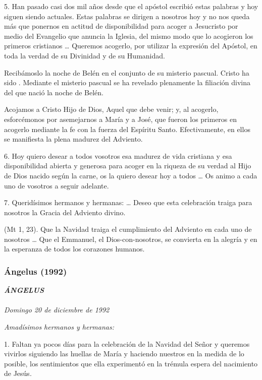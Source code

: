 5. Han pasado casi dos mil años desde que el apóstol escribió estas palabras y hoy siguen siendo actuales. Estas palabras se dirigen a nosotros hoy y no nos queda más que ponernos en actitud de disponibilidad para acoger a Jesucristo por medio del Evangelio que anuncia la Iglesia, del mismo modo que lo acogieron los primeros cristianos \ldots{} Queremos acogerlo, por utilizar la expresión del Apóstol, en toda la verdad de su Divinidad y de su Humanidad.

Recibámoslo la noche de Belén en el conjunto de su misterio pascual.  Cristo ha sido . Mediante el misterio pascual se ha revelado plenamente la filiación divina del que nació la noche de Belén.

Acojamos a Cristo Hijo de Dios, Aquel que debe venir; y, al acogerlo, esforcémonos por asemejarnos a María y a José, que fueron los primeros en acogerlo mediante la fe con la fuerza del Espíritu Santo. Efectivamente, en ellos se manifiesta la plena madurez del Adviento.

6. Hoy quiero desear a todos vosotros esa madurez de vida cristiana y esa disponibilidad abierta y generosa para acoger en la riqueza de su verdad al Hijo de Dios nacido según la carne, os la quiero desear hoy a todos \ldots{} Os animo a cada uno de vosotros a seguir adelante.

7. Queridísimos hermanos y hermanas:  \ldots{} Deseo que esta celebración traiga para nosotros la Gracia del Adviento divino.

 (Mt 1, 23). Que la Navidad traiga el cumplimiento del Adviento en cada uno de nosotros \ldots{} Que el Emmanuel, el Dios-con-nosotros, se convierta en la alegría y en la esperanza de todos los corazones humanos.

\subsubsection{Ángelus (1992)} \emph{\textbf{ÁNGELUS\\ }\\ Domingo 20 de diciembre de 1992}

\emph{Amadísimos hermanos y hermanas:}

1. Faltan ya pocos días para la celebración de la Navidad del Señor y queremos vivirlos siguiendo las huellas de María y haciendo nuestros en la medida de lo posible, los sentimientos que ella experimentó en la trémula espera del nacimiento de Jesús.

